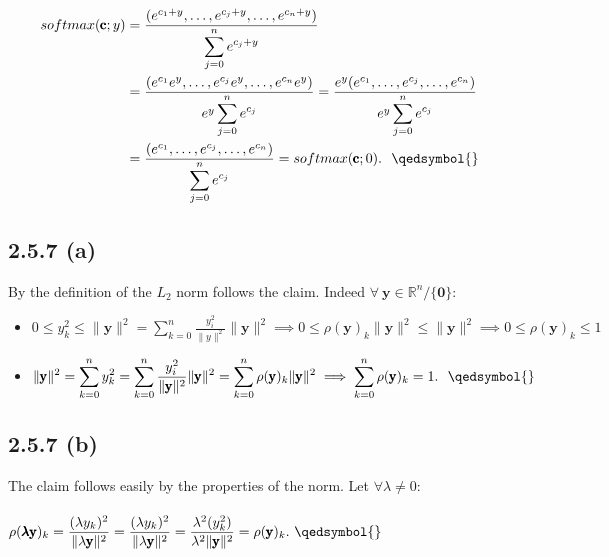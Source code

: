 \documentclass{exam}
\begin{document}
\begin{equation*}
    \begin{aligned}
        \displaystyle softmax(\pmb{\text{c}};y) &= \frac{(e^{c_1 + y}, \ldots ,e^{c_j + y}, \ldots ,e^{c_n + y} )}{\displaystyle\sum^{n}_{j = 0 }e^{c_j + y}} \\
                    &=\frac{(e^{c_1} e^{y}, \ldots ,e^{c_j} e^{y}, \ldots ,e^{c_n} e^{y} )}{e^{y}\displaystyle\sum^{n}_{j = 0 }e^{c_j}} = \frac{e^{y}(e^{c_1} , \ldots ,e^{c_j}, \ldots ,e^{c_n})}{e^{y}\displaystyle\sum^{n}_{j = 0 }e^{c_j}} \\
                    &= \frac{(e^{c_1}, \ldots ,e^{c_j}, \ldots ,e^{c_n} )}{\displaystyle\sum^{n}_{j = 0 }e^{c_j}} = softmax(\pmb{\text{c}};0).\ \ \qedsymbol{}
    \end{aligned}    
\end{equation*}

\subsection*{2.5.7 (a)}
By the definition of the $L_2$ norm follows the claim. Indeed $\forall \ \pmb{\text{y}} \in \mathbb{R}^n/\{\pmb{0}\}$:
\begin{itemize}
    \item $\displaystyle 0 \leq y^2_{k} \leq \lVert \pmb{\text{y}} \rVert^{2} =  \sum^{n}_{k = 0} \frac{y^2_i}{\lVert y \rVert^{2} } \lVert \pmb{\text{y}} \rVert^{2} \implies 0 \leq \rho(\pmb{\text{y}})_{k} \lVert \pmb{\text{y}} \rVert^{2} \leq \lVert \pmb{\text{y}} \rVert^{2} \implies 0 \leq \rho(\pmb{\text{y}})_{k} \leq 1$
    \item $\displaystyle\lVert \pmb{\text{y}} \rVert^{2} = \sum^{n}_{k = 0} y^2_{k} =  \sum^{n}_{k = 0} \frac{y^2_i}{\lVert \pmb{\text{y}} \rVert^{2} } \lVert \pmb{\text{y}} \rVert^{2} = \sum^{n}_{k = 0} \rho(\pmb{\text{y}})_{k} \lVert \pmb{\text{y}} \rVert^{2} \implies \sum^{n}_{k = 0} \rho(\pmb{\text{y}})_{k} = 1.  \ \ \qedsymbol{}$
\end{itemize} 

\subsection{2.5.7 (b)}
The claim follows easily by the properties of the norm. Let $\forall \lambda \neq 0$:\\
\\
$\displaystyle \rho(\pmb{ \lambda \text{y}})_{k} = \displaystyle\frac{(\lambda y_{k})^2}{\lVert \lambda \pmb{\text{y}} \rVert^{2} } = \displaystyle\frac{(\lambda y_{k})^2}{\lVert \lambda \pmb{\text{y}} \rVert^{2} } = \displaystyle\frac{\lambda^2 (y_{k}^2)}{\lambda^2 \lVert \pmb{\text{y}} \rVert^{2} } = \rho(\pmb{ \text{y}})_{k}. \ \qedsymbol{}$
\end{document}
